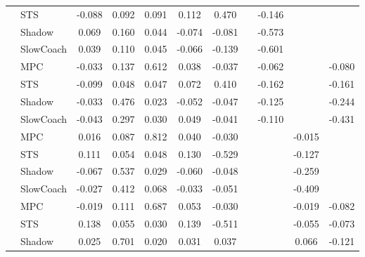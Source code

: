 \begin{tabular}{|l|l|*{9}{c|}}
                                                           & STS &   -0.088 &     0.092 &     0.091 &  0.112 &  0.470 &     &  -0.146 &      &       \\
                                                           & Shadow &    0.069 &     0.160 &     0.044 & -0.074 & -0.081 &     &  -0.573 &      &       \\
                                                           & SlowCoach &    0.039 &     0.110 &     0.045 & -0.066 & -0.139 &     &  -0.601 &      &       \\
\midrule
[True, True, True, True, True, False, True, False, True] & MPC &   -0.033 &     0.137 &     0.612 &  0.038 & -0.037 &     &  -0.062 &      &   -0.080 \\
                                                           & STS &   -0.099 &     0.048 &     0.047 &  0.072 &  0.410 &     &  -0.162 &      &   -0.161 \\
                                                           & Shadow &   -0.033 &     0.476 &     0.023 & -0.052 & -0.047 &     &  -0.125 &      &   -0.244 \\
                                                           & SlowCoach &   -0.043 &     0.297 &     0.030 &  0.049 & -0.041 &     &  -0.110 &      &   -0.431 \\
\midrule
[True, True, True, True, True, False, False, True, False] & MPC &    0.016 &     0.087 &     0.812 &  0.040 & -0.030 &     &      &  -0.015 &       \\
                                                           & STS &    0.111 &     0.054 &     0.048 &  0.130 & -0.529 &     &      &  -0.127 &       \\
                                                           & Shadow &   -0.067 &     0.537 &     0.029 & -0.060 & -0.048 &     &      &  -0.259 &       \\
                                                           & SlowCoach &   -0.027 &     0.412 &     0.068 & -0.033 & -0.051 &     &      &  -0.409 &       \\
\midrule
[True, True, True, True, True, False, False, True, True] & MPC &   -0.019 &     0.111 &     0.687 &  0.053 & -0.030 &     &      &  -0.019 &   -0.082 \\
                                                           & STS &    0.138 &     0.055 &     0.030 &  0.139 & -0.511 &     &      &  -0.055 &   -0.073 \\
                                                           & Shadow &    0.025 &     0.701 &     0.020 &  0.031 &  0.037 &     &      &   0.066 &   -0.121 \\

\end{tabular}
